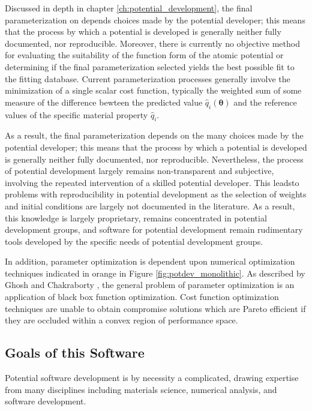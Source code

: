 Discussed in depth in chapter \ref{ch:potential_development}, the final parameterization on depends choices made by the potential developer; this means that the process by which a potential is developed is generally neither fully documented, nor reproducible.  Moreover, there is currently no objective method for evaluating the suitability of the function form of the atomic potential or determining if the final parameterization selected yields the best possible fit to the fitting database.  Current parameterization processes generally involve the minimization of a single scalar cost function, typically the weighted sum of some measure of the difference bewteen the predicted value $\hat{q}_i(\bm{\theta})$ and the reference values of the specific material property $\hat{q}_i$.

As a result, the final parameterization depends on the many choices made by the potential developer; this means that the process by which a potential is developed is generally neither fully documented, nor reproducible.  Nevertheless, the process of potential development largely remains non-transparent and subjective\cite{martinez2013_fitting,martinez2016_posmat}, involving the repeated intervention of a skilled potential developer\cite{brenner2000_fitting}.
This leadsto problems with reproducibility in potential development as the selection of weights and initial conditions are largely not documented in the literature.
As a result, this knowledge is largely proprietary, remains concentrated in potential development groups, and software for potential development remain rudimentary tools developed by the specific needs of potential development groups.

In addition, parameter optimization is dependent upon numerical optimization techniques indicated in orange in Figure \ref{fig:potdev_monolithic}.  As described by Ghosh and Chakraborty \cite{ghosh2014_potdev_pareto}, the general problem of parameter optimization is an application of black box function optimization.  Cost function optimization techniques are unable to obtain compromise solutions which are Pareto efficient if they are occluded within a convex region of performance space.

\subsection{Goals of this Software}

Potential software development is by necessity a complicated, drawing expertise from many disciplines including materials science, numerical analysis, and software development.

